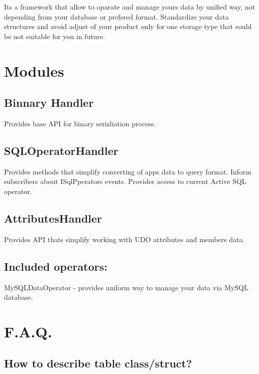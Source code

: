 It\textquotesingle{}s a framework that allow to oparate and manage yours data by unified way, not depending from your database or prefered format. Standardize your data structures and avoid adjust of your product only for one storage type that could be not suitable for you in future.

\section*{Modules}

\subsection*{Binnary Handler}

Provides base A\+PI for binary serizliation process.

\subsection*{S\+Q\+L\+Operator\+Handler}

Provides methods that simplify converting of app\textquotesingle{}s data to query format. Inform subscribers about {\ttfamily I\+Sql\+Pperators} events. Provides access to current {\ttfamily Active} S\+QL operator.

\subsection*{Attributes\+Handler}

Provides A\+PI thats simplify working with U\+DO attributes and members data.

\subsection*{Included operators\+:}


\begin{DoxyItemize}
\item {\ttfamily My\+S\+Q\+L\+Data\+Operator} -\/ provides uniform way to manage your data via My\+S\+QL database.
\end{DoxyItemize}

\section*{F.\+A.\+Q.}

\subsection*{How to describe table class/struct?}


